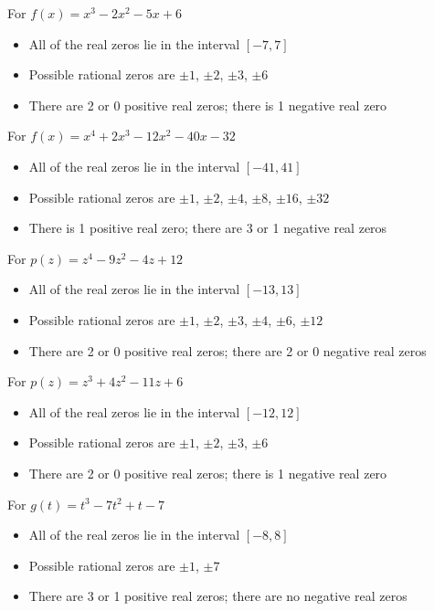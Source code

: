 \begin{exenum}

\item For $f(x) = x^{3} - 2x^{2} - 5x + 6$
\begin{itemize}
\item  All of the real zeros lie in the interval $[-7,7]$
\item  Possible rational zeros are $\pm 1$, $\pm 2$, $\pm 3$, $\pm 6$
\item  There are 2 or 0 positive real zeros;  there is 1 negative real zero
\end{itemize}

\item For  $f(x) = x^{4} + 2x^{3} - 12x^{2} - 40x - 32$
\begin{itemize}
\item  All of the real zeros lie in the interval $[-41,41]$
\item  Possible rational zeros are $\pm 1$, $\pm 2$, $\pm 4$, $\pm 8$, $\pm 16$, $\pm 32$
\item  There is 1 positive real zero;  there are 3 or 1 negative real zeros
\end{itemize}

\item For  $p(z) = z^{4} - 9z^{2} - 4z + 12$
\begin{itemize}
\item  All of the real zeros lie in the interval $[-13,13]$
\item  Possible rational zeros are $\pm 1$, $\pm 2$, $\pm 3$, $\pm 4$, $\pm 6$, $\pm 12$
\item  There are 2 or 0 positive real zeros;  there are 2 or 0 negative real zeros
\end{itemize}

\item For  $p(z) = z^{3} + 4z^{2} - 11z + 6$
\begin{itemize}
\item  All of the real zeros lie in the interval $[-12,12]$
\item  Possible rational zeros are $\pm 1$, $\pm 2$, $\pm 3$, $\pm 6$
\item  There are 2 or 0 positive real zeros;  there is 1 negative real zero
\end{itemize}

\item For   $g(t) = t^{3} - 7t^{2} + t - 7$
\begin{itemize}
\item  All of the real zeros lie in the interval $[-8,8]$
\item  Possible rational zeros are $\pm 1$, $\pm 7$
\item  There are 3 or 1 positive real zeros;  there are no negative real zeros
\end{itemize}


\end{exenum}

